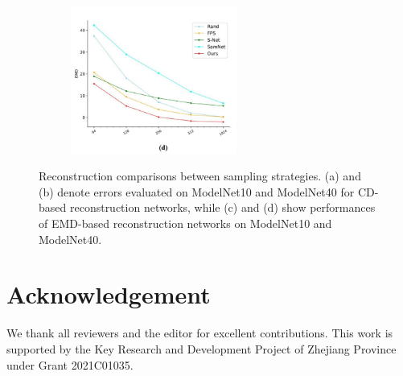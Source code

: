 \documentclass[review]{article}
\begin{document}
\begin{figure}[H]
\begin{subfigure}[b]{0.4\textwidth}
     \end{subfigure}
     \begin{subfigure}[b]{0.4\textwidth}
         \centering
         \includegraphics[width=0.6\textwidth]{pic14.jpg}
        
     \end{subfigure}
     
    \caption{Reconstruction comparisons between sampling strategies. (a) and (b) denote errors evaluated on ModelNet10 and ModelNet40 for CD-based reconstruction networks,
while (c) and (d) show performances of EMD-based reconstruction networks on ModelNet10 and ModelNet40.}
    \label{fig:fig4}
\end{figure}


\section*{Acknowledgement}
We thank all reviewers and the editor for excellent contributions. This work is supported by the Key Research and Development Project of Zhejiang Province under Grant 2021C01035.

\section*{}
\printbibliography
\end{document}
